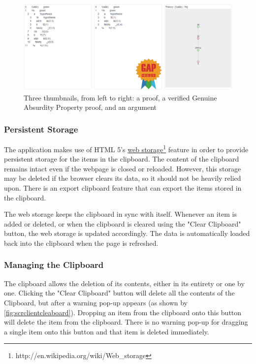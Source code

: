 \documentclass[11pt,twoside,a4paper]{report}
\begin{document}
\begin{figure}[htp]
\centerline{\includegraphics[scale=0.4]{img/scr-client-thumb.png}}
\caption{Three thumbnails, from left to right: a proof, a verified Genuine Absurdity Property proof, and an argument\label{fig:scrclientthumb}}
\end{figure}

\subsubsection{Persistent Storage}
The application makes use of HTML 5's \href{http://en.wikipedia.org/wiki/Web\_storage}{web storage}\footnote{http://en.wikipedia.org/wiki/Web\_storage} feature in order to provide persistent storage for the items in the clipboard. The content of the clipboard remains intact even if the webpage is closed or reloaded. However, this storage may be deleted if the browser clears its data, so it should not be heavily relied upon. There is an export clipboard feature that can export the items stored in the clipboard.

The web storage keeps the clipboard in sync with itself. Whenever an item is added or deleted, or when the clipboard is cleared using the "Clear Clipboard" button, the web storage is updated accordingly. The data is automatically loaded back into the clipboard when the page is refreshed.

\subsubsection{Managing the Clipboard}
The clipboard allows the deletion of its contents, either in its entirety or one by one. Clicking the "Clear Clipboard" button will delete all the contents of the Clipboard, but after a warning pop-up appears (as shown by \autoref{fig:scrclientcleaboard}). Dropping an item from the clipboard onto this button will delete the item from the clipboard. There is no warning pop-up for dragging a single item onto this button and that item is deleted immediately.
\end{document}
